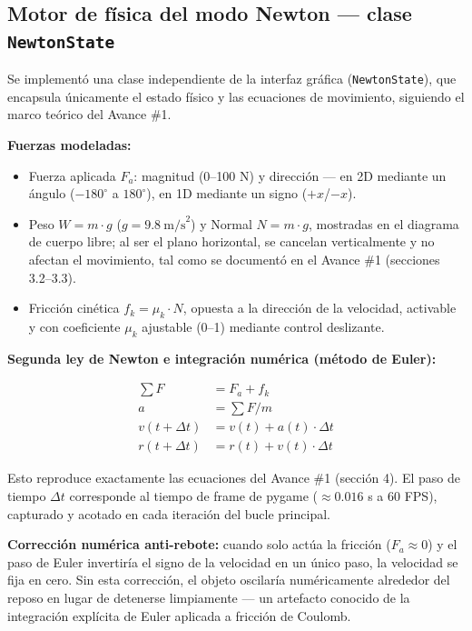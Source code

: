 \documentclass[12pt,letterpaper]{article}
\begin{document}
\subsection{Motor de física del modo Newton --- clase \texttt{NewtonState}}

Se implementó una clase independiente de la interfaz gráfica (\texttt{NewtonState}), que encapsula únicamente el estado físico y las ecuaciones de movimiento, siguiendo el marco teórico del Avance \#1.

\textbf{Fuerzas modeladas:}
\begin{itemize}[leftmargin=1.5em]
  \item Fuerza aplicada $F_a$: magnitud (0--100 N) y dirección --- en 2D mediante un ángulo ($-180^\circ$ a $180^\circ$), en 1D mediante un signo ($+x$/$-x$).
  \item Peso $W = m \cdot g$ ($g = 9.8\ \text{m/s}^2$) y Normal $N = m \cdot g$, mostradas en el diagrama de cuerpo libre; al ser el plano horizontal, se cancelan verticalmente y no afectan el movimiento, tal como se documentó en el Avance \#1 (secciones 3.2--3.3).
  \item Fricción cinética $f_k = \mu_k \cdot N$, opuesta a la dirección de la velocidad, activable y con coeficiente $\mu_k$ ajustable (0--1) mediante control deslizante.
\end{itemize}

\textbf{Segunda ley de Newton e integración numérica (método de Euler):}

\begin{align*}
\sum F &= F_a + f_k \\
a &= \sum F / m \\
v(t+\Delta t) &= v(t) + a(t)\cdot \Delta t \\
r(t+\Delta t) &= r(t) + v(t)\cdot \Delta t
\end{align*}

Esto reproduce exactamente las ecuaciones del Avance \#1 (sección 4). El paso de tiempo $\Delta t$ corresponde al tiempo de frame de pygame ($\approx 0.016$ s a 60 FPS), capturado y acotado en cada iteración del bucle principal.

\textbf{Corrección numérica anti-rebote:} cuando solo actúa la fricción ($F_a \approx 0$) y el paso de Euler invertiría el signo de la velocidad en un único paso, la velocidad se fija en cero. Sin esta corrección, el objeto oscilaría numéricamente alrededor del reposo en lugar de detenerse limpiamente --- un artefacto conocido de la integración explícita de Euler aplicada a fricción de Coulomb.
\end{document}
